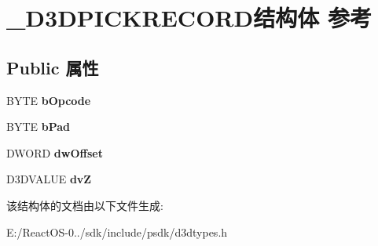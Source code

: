 \hypertarget{struct___d3_d_p_i_c_k_r_e_c_o_r_d}{}\section{\+\_\+\+D3\+D\+P\+I\+C\+K\+R\+E\+C\+O\+R\+D结构体 参考}
\label{struct___d3_d_p_i_c_k_r_e_c_o_r_d}
\subsection*{Public 属性}
\begin{DoxyCompactItemize}
\item 
\mbox{\label{struct___d3_d_p_i_c_k_r_e_c_o_r_d_a99cbd1a915b089ada437b4b3da49ce8e}} 
B\+Y\+TE {\bfseries b\+Opcode}
\item 
\mbox{\label{struct___d3_d_p_i_c_k_r_e_c_o_r_d_ad8c5dfa3de87839e7b16fd97ff22ba82}} 
B\+Y\+TE {\bfseries b\+Pad}
\item 
\mbox{\label{struct___d3_d_p_i_c_k_r_e_c_o_r_d_ac134c2f1185fb87ad3f5bdd950e9741a}} 
D\+W\+O\+RD {\bfseries dw\+Offset}
\item 
\mbox{\label{struct___d3_d_p_i_c_k_r_e_c_o_r_d_a102cbeb0da6af854fd90435af137216e}} 
D3\+D\+V\+A\+L\+UE {\bfseries dvZ}
\end{DoxyCompactItemize}


该结构体的文档由以下文件生成\+:\begin{DoxyCompactItemize}
\item 
E\+:/\+React\+O\+S-\/0../sdk/include/psdk/d3dtypes.\+h\end{DoxyCompactItemize}
